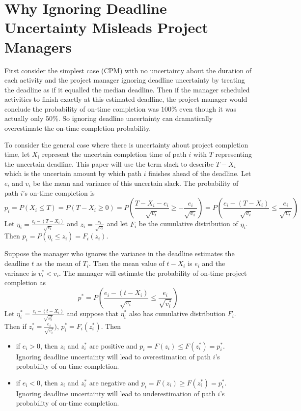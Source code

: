 \documentclass[11pt]{article}
\begin{document}
\section{Why Ignoring Deadline Uncertainty Misleads Project Managers}
First consider the simplest case (CPM) with no uncertainty about the duration of each activity and the project manager ignoring deadline uncertainty by treating the deadline as if it equalled the median deadline.   Then if the manager scheduled activities to finish exactly at this estimated deadline, the project manager would conclude the probability of on-time completion was $100\%$ even though it was actually only $50\%$.  So ignoring deadline uncertainty can dramatically overestimate the on-time completion probability.\par
To consider the general case where there is uncertainty about project completion time,  let $X_i$ represent the uncertain completion time of path $i$ with $T$ representing the uncertain deadline.  This paper will use the term slack to describe $T-X_i$ which is the uncertain amount by which path $i$ finishes ahead of the deadline.  Let $e_i$ and $v_i$ be the mean and variance of this uncertain slack.  The probability of path $i$'s on-time completion is
$$ p_i= P(X_i \leq T) = P(T-X_i \geq 0) = P(\frac{T-X_i-e_i}{\sqrt{v_i}} \geq - \frac{e_i}{\sqrt{v_i}}) =
P(\frac{e_i-(T-X_i)}{\sqrt{v_i}} \leq \frac{e_i}{\sqrt{v_i}})  $$
Let $\eta_i=\frac{e_i-(T-X_i)}{\sqrt{v_i}}$ and $z_i=\frac{e_i}{\sqrt{v_i}}$ and let
$F_i$ be the cumulative distribution of $\eta_i$.  Then $p_i=P(\eta_i \leq z_i)=F_i(z_i)$. \par   
Suppose the manager who ignores the variance in the deadline estimates the deadline $t$ as the mean of $T_i$.  Then the mean value of $t-X_i$ is $e_i$ and the variance is $v^*_i<v_i$.    The manager will estimate the probability of on-time project completion as 
$$ p^*= P(\frac{e_i-(t-X_i)}{\sqrt{v_i}} \leq \frac{e_i}{\sqrt{v^*_i}})  $$
Let $\eta^*_i=\frac{e_i-(t-X_i)}{\sqrt{v^*_i}}$ and suppose that $\eta^*_i$ also has cumulative distribution $F_i$.   Then if $z^*_i= \frac{e_i}{\sqrt{v^*_i}})$, $p^*_i=F_i(z^*_i)$.  Then
\begin{itemize}
\item if $e_i>0$, then $z_i$ and $z^*_i$ are positive and $p_i=F(z_i) \leq F(z^*_i)=p^*_i$. Ignoring deadline uncertainty will lead to overestimation of path $i$'s probability of on-time completion.
\item if $e_i<0$, then $z_i$ and $z^*_i$ are negative and $p_i=F(z_i) \geq F(z^*_i)=p^*_i$. Ignoring deadline uncertainty will lead to underestimation of path $i$'s probability of on-time completion.
\end{itemize}
\end{document}
